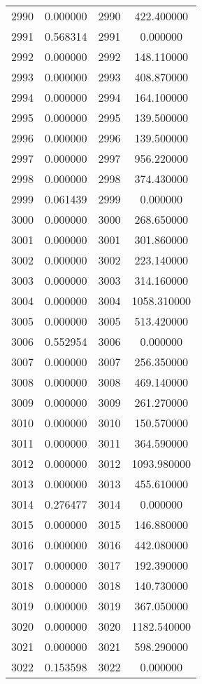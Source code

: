 \documentclass[12pt]{article}
\begin{document}
\begin{longtable}{@{}cccc@{}}
2990 & 0.000000 & 2990 & 422.400000 \\
2991 & 0.568314 & 2991 & 0.000000 \\
2992 & 0.000000 & 2992 & 148.110000 \\
2993 & 0.000000 & 2993 & 408.870000 \\
2994 & 0.000000 & 2994 & 164.100000 \\
2995 & 0.000000 & 2995 & 139.500000 \\
2996 & 0.000000 & 2996 & 139.500000 \\
2997 & 0.000000 & 2997 & 956.220000 \\
2998 & 0.000000 & 2998 & 374.430000 \\
2999 & 0.061439 & 2999 & 0.000000 \\
3000 & 0.000000 & 3000 & 268.650000 \\
3001 & 0.000000 & 3001 & 301.860000 \\
3002 & 0.000000 & 3002 & 223.140000 \\
3003 & 0.000000 & 3003 & 314.160000 \\
3004 & 0.000000 & 3004 & 1058.310000 \\
3005 & 0.000000 & 3005 & 513.420000 \\
3006 & 0.552954 & 3006 & 0.000000 \\
3007 & 0.000000 & 3007 & 256.350000 \\
3008 & 0.000000 & 3008 & 469.140000 \\
3009 & 0.000000 & 3009 & 261.270000 \\
3010 & 0.000000 & 3010 & 150.570000 \\
3011 & 0.000000 & 3011 & 364.590000 \\
3012 & 0.000000 & 3012 & 1093.980000 \\
3013 & 0.000000 & 3013 & 455.610000 \\
3014 & 0.276477 & 3014 & 0.000000 \\
3015 & 0.000000 & 3015 & 146.880000 \\
3016 & 0.000000 & 3016 & 442.080000 \\
3017 & 0.000000 & 3017 & 192.390000 \\
3018 & 0.000000 & 3018 & 140.730000 \\
3019 & 0.000000 & 3019 & 367.050000 \\
3020 & 0.000000 & 3020 & 1182.540000 \\
3021 & 0.000000 & 3021 & 598.290000 \\
3022 & 0.153598 & 3022 & 0.000000 \\

\end{longtable}
\end{document}
